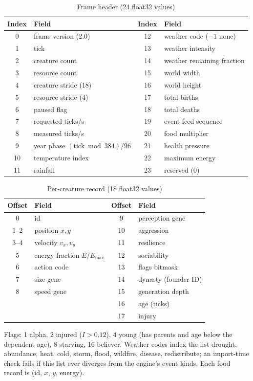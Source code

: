 \begin{longtable}{cl|cl}
\caption{Frame header (24 float32 values)}\\
\toprule
Index & Field & Index & Field \\
\midrule
0 & frame version (2.0) & 12 & weather code ($-1$ none) \\
1 & tick & 13 & weather intensity \\
2 & creature count & 14 & weather remaining fraction \\
3 & resource count & 15 & world width \\
4 & creature stride (18) & 16 & world height \\
5 & resource stride (4) & 17 & total births \\
6 & paused flag & 18 & total deaths \\
7 & requested ticks/s & 19 & event-feed sequence \\
8 & measured ticks/s & 20 & food multiplier \\
9 & year phase $(\text{tick}\bmod384)/96$ & 21 & health pressure \\
10 & temperature index & 22 & maximum energy \\
11 & rainfall & 23 & reserved (0) \\
\bottomrule
\end{longtable}

\begin{longtable}{cl|cl}
\caption{Per-creature record (18 float32 values)}\\
\toprule
Offset & Field & Offset & Field \\
\midrule
0 & id & 9 & perception gene \\
1--2 & position $x,y$ & 10 & aggression \\
3--4 & velocity $v_x,v_y$ & 11 & resilience \\
5 & energy fraction $E/E_{\max}$ & 12 & sociability \\
6 & action code & 13 & flags bitmask \\
7 & size gene & 14 & dynasty (founder ID) \\
8 & speed gene & 15 & generation depth \\
 & & 16 & age (ticks) \\
 & & 17 & injury \\
\bottomrule
\end{longtable}

Flags: 1 alpha, 2 injured ($I>0.12$), 4 young (has parents and age below the
dependent age), 8 starving, 16 believer. Weather codes index the list drought,
abundance, heat, cold, storm, flood, wildfire, disease, redistribute; an import-time
check fails if this list ever diverges from the engine's event kinds. Each food
record is (id, $x$, $y$, energy).

